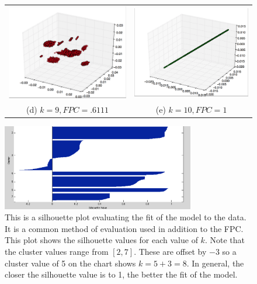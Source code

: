 \documentclass[letterpaper, 12pt]{article}
\begin{document}
\begin{figure}[H]
\centering
\begin{tabular}{cc}
 \includegraphics[width=65mm]{k9} &   \includegraphics[width=65mm]{k10} \\
(d) $k = 9, FPC = .6111$ & (e) $k = 10, FPC = 1$ \\[6pt]
\end{tabular}
\end{figure}

\begin{figure}[H]%
   \centering
   \caption{\label{k_means_sil} This is a silhouette plot evaluating the fit of the model to the data. It is a common method of evaluation used in addition to the FPC. This plot shows the silhouette values for each value of $k$. Note that the cluster values range from $[2,7]$. These are offset by $-3$ so a cluster value of 5 on the chart shows $k = 5 + 3 = 8$. In general, the closer the silhouette value is to 1, the better the fit of the model. }
  \includegraphics[width=0.75\textwidth]{k_means_sil}
\end{figure}
\end{document}
